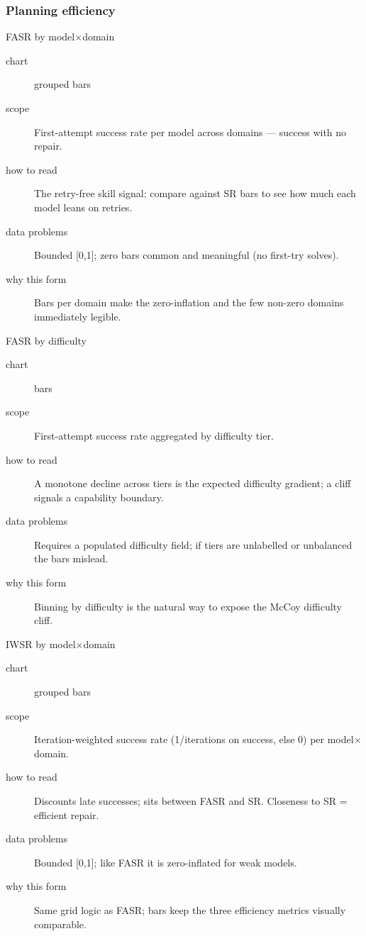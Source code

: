 \subsubsection{Planning efficiency}

\begin{bmplotcard}{FASR by model\(\times\)domain}
\begin{description}
\item[chart] grouped bars
\item[scope] First-attempt success rate per model across domains --- success with no repair.
\item[how to read] The retry-free skill signal; compare against SR bars to see how much each model leans on retries.
\item[data problems] Bounded [0,1]; zero bars common and meaningful (no first-try solves).
\item[why this form] Bars per domain make the zero-inflation and the few non-zero domains immediately legible.
\end{description}
\end{bmplotcard}

\begin{bmplotcard}{FASR by difficulty}
\begin{description}
\item[chart] bars
\item[scope] First-attempt success rate aggregated by difficulty tier.
\item[how to read] A monotone decline across tiers is the expected difficulty gradient; a cliff signals a capability boundary.
\item[data problems] Requires a populated difficulty field; if tiers are unlabelled or unbalanced the bars mislead.
\item[why this form] Binning by difficulty is the natural way to expose the McCoy difficulty cliff.
\end{description}
\end{bmplotcard}

\begin{bmplotcard}{IWSR by model\(\times\)domain}
\begin{description}
\item[chart] grouped bars
\item[scope] Iteration-weighted success rate (1/iterations on success, else 0) per model\(\times\)domain.
\item[how to read] Discounts late successes; sits between FASR and SR. Closeness to SR = efficient repair.
\item[data problems] Bounded [0,1]; like FASR it is zero-inflated for weak models.
\item[why this form] Same grid logic as FASR; bars keep the three efficiency metrics visually comparable.
\end{description}
\end{bmplotcard}

